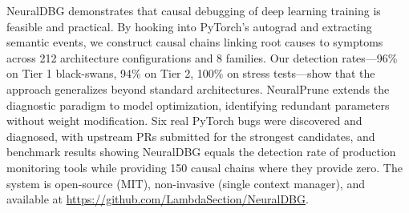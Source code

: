 \documentclass[11pt]{article}
\begin{document}
NeuralDBG demonstrates that causal debugging of deep learning training is feasible and practical. By hooking into PyTorch's autograd and extracting semantic events, we construct causal chains linking root causes to symptoms across 212 architecture configurations and 8 families. Our detection rates—96\% on Tier 1 black-swans, 94\% on Tier 2, 100\% on stress tests—show that the approach generalizes beyond standard architectures. NeuralPrune extends the diagnostic paradigm to model optimization, identifying redundant parameters without weight modification. Six real PyTorch bugs were discovered and diagnosed, with upstream PRs submitted for the strongest candidates, and benchmark results showing NeuralDBG equals the detection rate of production monitoring tools while providing 150 causal chains where they provide zero. The system is open-source (MIT), non-invasive (single context manager), and available at \url{https://github.com/LambdaSection/NeuralDBG}.

\end{document}
